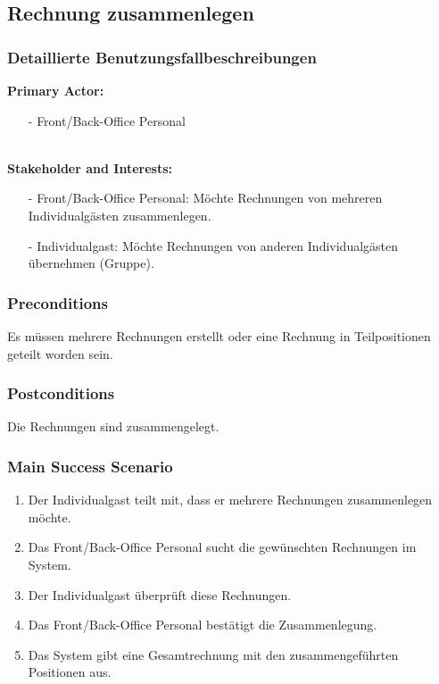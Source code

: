 \documentclass[./detailed_overview_usecases.tex]{subfiles}
\begin{document}
    \newpage
    \subsection{Rechnung zusammenlegen}
    \subsubsection{Detaillierte Benutzungsfallbeschreibungen}
    \textbf{Primary Actor:}
    \begin{itemize}
        \item [-]  Front/Back-Office Personal
    \end{itemize}
    \\
    \textbf{Stakeholder and Interests:}
    \begin{itemize}
        \item[-] Front/Back-Office Personal: Möchte Rechnungen von mehreren Individualgästen zusammenlegen.
        \item[-] Individualgast: Möchte Rechnungen von anderen Individualgästen übernehmen (Gruppe).
    \end{itemize}

    \subsubsection*{Preconditions}
    Es müssen mehrere Rechnungen erstellt oder eine Rechnung in Teilpositionen geteilt worden sein.

    \subsubsection*{Postconditions}
    Die Rechnungen sind zusammengelegt.

    \subsubsection*{Main Success Scenario}
    \begin{enumerate}
        \item Der Individualgast teilt mit, dass er mehrere Rechnungen zusammenlegen möchte.
        \item Das Front/Back-Office Personal sucht die gewünschten Rechnungen im System.
        \item Der Individualgast überprüft diese Rechnungen.
        \item Das Front/Back-Office Personal bestätigt die Zusammenlegung.
        \item Das System gibt eine Gesamtrechnung mit den zusammengeführten Positionen aus.
    \end{enumerate}
\end{document}
